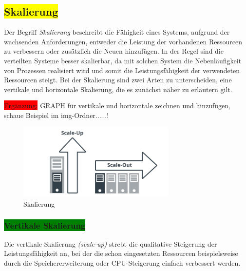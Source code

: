 \subsection{\colorbox{yellow}{Skalierung} }

Der Begriff \textit{Skalierung} beschreibt die Fähigkeit eines Systems,  aufgrund der wachsenden Anforderungen, entweder die Leistung der vorhandenen Ressourcen zu verbessern oder zusätzlich die Neuen hinzufügen. In der Regel sind die verteilten Systeme besser skalierbar, da mit solchen System die Nebenläufigkeit von Prozessen realisiert wird und somit die Leistungsfähigkeit der verwendeten Ressourcen steigt.
Bei der Skalierung sind zwei Arten zu unterscheiden, eine vertikale und horizontale Skalierung, die es zunächst näher zu erläutern gilt.

\colorbox{red}{Ergänzung:} GRAPH für vertikale und horizontale zeichnen und hinzufügen, schaue Beispiel im img-Ordner......!

\begin{figure}[H]
\centering
\includegraphics[width=0.7\textwidth]{resources/scales}
\caption[Skalierung]{Skalierung\protect\footnotemark}
\label{img:scales}
\end{figure}

\subsubsection{\colorbox{green}{Vertikale Skalierung}}

Die vertikale Skalierung \textit{(scale-up)} strebt die qualitative Steigerung der Leistungsfähigkeit an, bei der die schon eingesetzten Ressourcen beispielsweise durch die Speichererweiterung oder CPU-Steigerung einfach verbessert werden.

